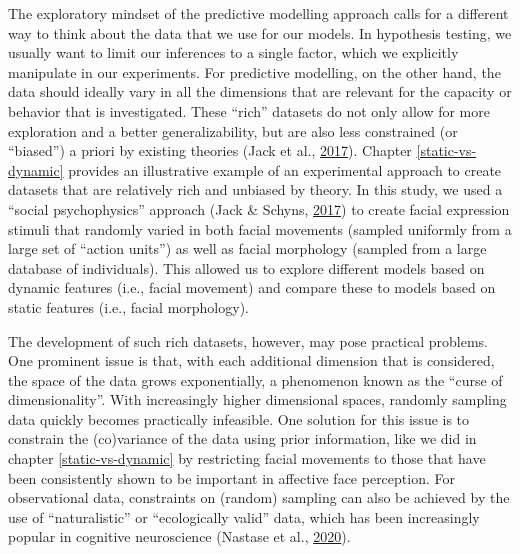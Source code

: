 \documentclass[12pt,american,a4paper,oneside,]{memoir} %
\begin{document}
The exploratory mindset of the predictive modelling approach calls for a different way to think about the data that we use for our models. In hypothesis testing, we usually want to limit our inferences to a single factor, which we explicitly manipulate in our experiments. For predictive modelling, on the other hand, the data should ideally vary in all the dimensions that are relevant for the capacity or behavior that is investigated. These ``rich'' datasets do not only allow for more exploration and a better generalizability, but are also less constrained (or ``biased'') a priori by existing theories (Jack et al., \protect\hyperlink{ref-Jack2017-qp}{2017}). Chapter \ref{static-vs-dynamic} provides an illustrative example of an experimental approach to create datasets that are relatively rich and unbiased by theory. In this study, we used a ``social psychophysics'' approach (Jack \& Schyns, \protect\hyperlink{ref-Jack2017-gt}{2017}) to create facial expression stimuli that randomly varied in both facial movements (sampled uniformly from a large set of ``action units'') as well as facial morphology (sampled from a large database of individuals). This allowed us to explore different models based on dynamic features (i.e., facial movement) and compare these to models based on static features (i.e., facial morphology).

The development of such rich datasets, however, may pose practical problems. One prominent issue is that, with each additional dimension that is considered, the space of the data grows exponentially, a phenomenon known as the ``curse of dimensionality''. With increasingly higher dimensional spaces, randomly sampling data quickly becomes practically infeasible. One solution for this issue is to constrain the (co)variance of the data using prior information, like we did in chapter \ref{static-vs-dynamic} by restricting facial movements to those that have been consistently shown to be important in affective face perception. For observational data, constraints on (random) sampling can also be achieved by the use of ``naturalistic'' or ``ecologically valid'' data, which has been increasingly popular in cognitive neuroscience (Nastase et al., \protect\hyperlink{ref-Nastase2020-he}{2020}).
\end{document}
